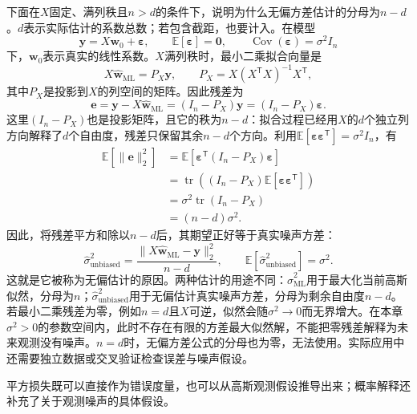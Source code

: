下面在$X$固定、满列秩且$n>d$的条件下，说明为什么无偏方差估计的分母为$n-d$。$d$表示实际估计的系数总数；若包含截距，也要计入。在模型
\begin{equation} 
 \bm y=X\bm w_0+\bm\varepsilon,
 \qquad
 \mathbb E[\bm\varepsilon]=\bm0,
 \qquad
 \operatorname{Cov}(\bm\varepsilon)=\sigma^2I_n
\end{equation}
下，$\bm w_0$表示真实的线性系数。$X$满列秩时，最小二乘拟合向量是
\begin{equation}
 X\hat{\bm w}_{\mathrm{ML}}=P_X\bm y,
 \qquad
 P_X=X(X^{\mathsf T}X)^{-1}X^{\mathsf T},
\end{equation}
其中$P_X$是投影到$X$的列空间的矩阵。因此残差为
\begin{equation}
 \bm e=\bm y-X\hat{\bm w}_{\mathrm{ML}}
 =(I_n-P_X)\bm y
 =(I_n-P_X)\bm\varepsilon.
\end{equation}
这里$(I_n-P_X)$也是投影矩阵，且它的秩为$n-d$：拟合过程已经用$X$的$d$个独立列方向解释了$d$个自由度，残差只保留其余$n-d$个方向。利用$\mathbb E[\bm\varepsilon\bm\varepsilon^{\mathsf T}]=\sigma^2I_n$，有
\begin{align}
 \mathbb E[\|\bm e\|_2^2]
 &=\mathbb E[\bm\varepsilon^{\mathsf T}(I_n-P_X)\bm\varepsilon]\\
 &=\operatorname{tr}\left((I_n-P_X)\mathbb E[\bm\varepsilon\bm\varepsilon^{\mathsf T}]\right)\\
 &=\sigma^2\operatorname{tr}(I_n-P_X)\\
 &=(n-d)\sigma^2.
 \label{eq:linear-residual-sum-expectation}
\end{align}
因此，将残差平方和除以$n-d$后，其期望正好等于真实噪声方差：
\begin{equation}
 \hat\sigma^2_{\mathrm{unbiased}}
 =\frac{\|X\hat{\bm w}_{\mathrm{ML}}-\bm y\|_2^2}{n-d},
 \qquad
 \mathbb E[\hat\sigma^2_{\mathrm{unbiased}}]=\sigma^2.
 \label{eq:linear-noise-variance-unbiased}
\end{equation}
这就是它被称为无偏估计的原因。两种估计的用途不同：$\hat\sigma^2_{\mathrm{ML}}$用于最大化当前高斯似然，分母为$n$；$\hat\sigma^2_{\mathrm{unbiased}}$用于无偏估计真实噪声方差，分母为剩余自由度$n-d$。若最小二乘残差为零，例如$n=d$且$X$可逆，似然会随$\sigma^2\to0$而无界增大。在本章$\sigma^2>0$的参数空间内，此时不存在有限的方差最大似然解，不能把零残差解释为未来观测没有噪声。$n=d$时，无偏方差公式的分母也为零，无法使用。实际应用中还需要独立数据或交叉验证检查误差与噪声假设。

平方损失既可以直接作为错误度量，也可以从高斯观测假设推导出来；概率解释还补充了关于观测噪声的具体假设。

